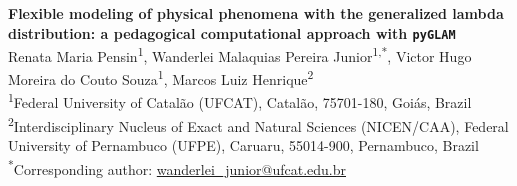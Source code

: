 \begin{center}
{\Large\bfseries Flexible modeling of physical phenomena with the generalized lambda
distribution: a pedagogical computational approach with \texttt{pyGLAM}}
\\[2ex]

{\small
  Renata Maria Pensin\textsuperscript{1},
  Wanderlei Malaquias Pereira Junior\textsuperscript{1,*},
  Victor Hugo Moreira do Couto Souza\textsuperscript{1},
  Marcos Luiz Henrique\textsuperscript{2}
}
\\[1ex]

{\footnotesize
  \textsuperscript{1}Federal University of Catal\~ao (UFCAT), Catal\~ao,
  75701-180, Goi\'as, Brazil \\[0.3ex]
  \textsuperscript{2}Interdisciplinary Nucleus of Exact and Natural Sciences
  (NICEN/CAA), Federal University of Pernambuco (UFPE), Caruaru,
  55014-900, Pernambuco, Brazil
}
\\[0.8ex]

{\footnotesize \textsuperscript{*}Corresponding author:
\href{mailto:wanderlei_junior@ufcat.edu.br}{wanderlei\_junior@ufcat.edu.br}}
\end{center}
